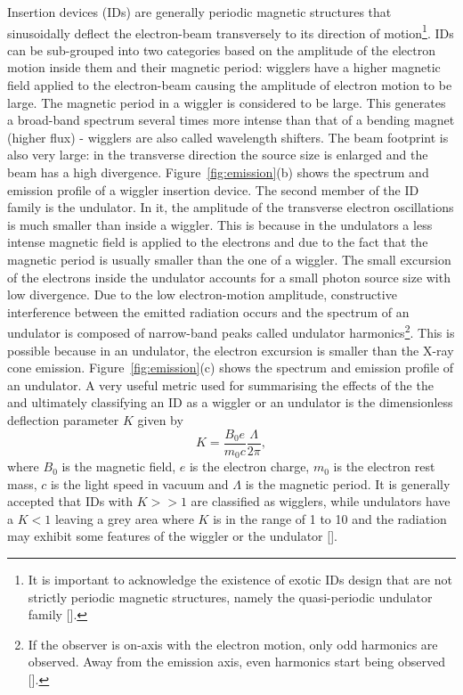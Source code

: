 \begin{refsection}
Insertion devices (IDs) are generally periodic magnetic structures that sinusoidally deflect the electron-beam transversely to its direction of motion\footnote{It is important to acknowledge the existence of exotic IDs design that are not strictly periodic magnetic structures, namely the quasi-periodic undulator family [\cite[\textit{§7.2}]{Elleaume2013}].}. IDs can be sub-grouped into two categories based on the amplitude of the electron motion inside them and their magnetic period: wigglers have a higher magnetic field applied to the electron-beam causing the amplitude of electron motion to be large. The magnetic period in a wiggler is considered to be large. This generates a broad-band spectrum several times more intense than that of a bending magnet (higher flux) - wigglers are also called wavelength shifters. The beam footprint is also very large: in the transverse direction the source size is enlarged and the beam has a high divergence. Figure~\ref{fig:emission}(b) shows the spectrum and emission profile of a wiggler insertion device. The second member of the ID family is the undulator. In it, the amplitude of the transverse electron oscillations is much smaller than inside a wiggler. This is because in the undulators a less intense magnetic field is applied to the electrons and due to the fact that the magnetic period is usually smaller than the one of a wiggler. The small excursion of the electrons inside the undulator accounts for a small photon source size with low divergence. Due to the low electron-motion amplitude, constructive interference between the emitted radiation occurs and the spectrum of an undulator is composed of narrow-band peaks called undulator harmonics\footnote{If the observer is on-axis with the electron motion, only odd harmonics are observed. Away from the emission axis, even harmonics start being observed [\cite[\textit{§4.2}]{Clarke2004}].}. This is possible because in an undulator, the electron excursion is smaller than the X-ray cone emission. Figure~\ref{fig:emission}(c) shows the spectrum and emission profile of an undulator. A very useful metric used for summarising the effects of the  the  and ultimately classifying an ID as a wiggler or an undulator is the dimensionless deflection parameter $K$ given by
\begin{equation}
    K=\frac{B_0e}{m_0c}\frac{\Lambda}{2\pi},
\end{equation}
where $B_0$ is the magnetic field, $e$ is the electron charge, $m_0$ is the electron rest mass, $c$ is the light speed in vacuum and $\Lambda$ is the magnetic period. It is generally accepted that IDs with $K>>1$ are classified as wigglers, while undulators have a $K<1$ leaving a grey area where $K$ is in the range of 1 to 10 and the radiation may exhibit some features of the wiggler or the undulator [\cite[§3.1]{Clarke2004}].


\end{refsection}
